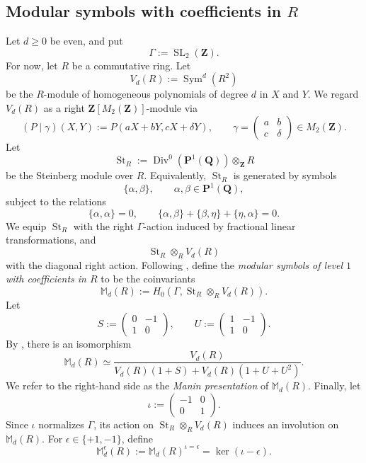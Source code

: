\documentclass[11pt]{article}
\newcommand{\Z}{\mathbf Z}
\newcommand{\Q}{\mathbf Q}
\theoremstyle{plain}
\theoremstyle{definition}
\theoremstyle{remark}
\numberwithin{equation}{section}
\begin{document}
\subsection{Modular symbols with coefficients in \texorpdfstring{\(R\)}{R}} Let \(d\geq0\) be even, and put \[ \Gamma:=\operatorname{SL}_2(\Z). \] For now, let \(R\) be a commutative ring. Let \[ V_d(R):=\operatorname{Sym}^d(R^2) \] be the \(R\)-module of homogeneous polynomials of degree \(d\) in \(X\) and \(Y\). We regard \(V_d(R)\) as a right \(\Z[M_2(\Z)]\)-module via \[ (P\mid\gamma)(X,Y) := P(aX+bY,cX+\delta Y), \qquad \gamma= \begin{pmatrix} a&b\\ c&\delta \end{pmatrix} \in M_2(\Z). \] Let \[ \operatorname{St}_R := \operatorname{Div}^0\!\left(\mathbf P^1(\Q)\right)\otimes_{\Z}R \] be the Steinberg module over \(R\). Equivalently, \(\operatorname{St}_R\) is generated by symbols \[ \{\alpha,\beta\}, \qquad \alpha,\beta\in\mathbf P^1(\Q), \] subject to the relations \[ \{\alpha,\alpha\}=0, \qquad \{\alpha,\beta\}+\{\beta,\eta\}+\{\eta,\alpha\}=0. \] We equip \(\operatorname{St}_R\) with the right \(\Gamma\)-action induced by fractional linear transformations, and \[ \operatorname{St}_R\otimes_RV_d(R) \] with the diagonal right action. Following \cite[Notation~2.1 and Definition~3.1]{WieseModularSymbols}, define the \emph{modular symbols of level \(1\) with coefficients in \(R\)} to be the coinvariants \[ \mathbb M_d(R) := H_0\!\left( \Gamma, \operatorname{St}_R\otimes_RV_d(R) \right). \] Let \[ S:= \begin{pmatrix} 0&-1\\ 1&0 \end{pmatrix}, \qquad U:= \begin{pmatrix} 1&-1\\ 1&0 \end{pmatrix}. \] By \cite[Theorem~3.5(1)]{WieseModularSymbols}, there is an isomorphism \[ \mathbb M_d(R) \simeq \frac{V_d(R)} {V_d(R)(1+S)+V_d(R)(1+U+U^2)}. \] We refer to the right-hand side as the \emph{Manin presentation} of \(\mathbb M_d(R)\). Finally, let \[ \iota:= \begin{pmatrix} -1&0\\ 0&1 \end{pmatrix}. \] Since \(\iota\) normalizes \(\Gamma\), its action on \(\operatorname{St}_R\otimes_RV_d(R)\) induces an involution on \(\mathbb M_d(R)\). For $\epsilon \in \{+1, -1\}$, define \[ \mathbb M_d^\epsilon(R) := \mathbb M_d(R)^{\iota=\epsilon} = \ker( \iota - \epsilon). \]
\end{document}
